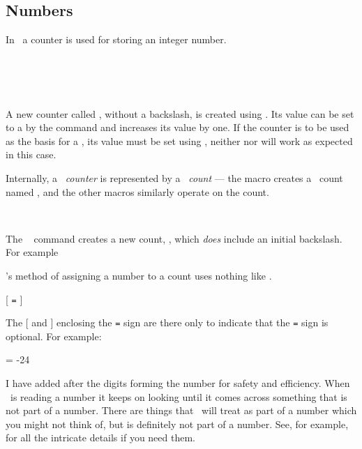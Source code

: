 \subsection{Numbers}

    In \ltx\ a counter is used for storing an integer number.
\begin{syntax}
\cmd{\newcounter} \\
\cmd{\setcounter} \\
\cmd{\stepcounter}  \\
\end{syntax}
A new counter called , without a backslash, is created using
\cmd{\newcounter}. Its value can be set to a  by the
\cmd{\setcounter} command and \cmd{\stepcounter} increases its value by one.
If the counter is to be used as the basis for a \cmd{\label}, its
value must be set using , neither \cmd{\stepcounter}
nor \cmd{\setcounter} will work as expected in this case.

    Internally, a \ltx\ \emph{counter} is represented by a \tx\ 
\emph{count} --- the \cmd{\newcounter} macro creates a
\tx\ count named , and the other 
macros similarly operate on the \cs{c@}\meta{counter} count.


\begin{syntax}
\cmd{\newcount} \\
\end{syntax}
The \tx\ \cmd{\newcount} command creates a new count, \meta{count}, which 
\emph{does} include an initial backslash. For example
\begin{lcode}
\newcount\mycount
\end{lcode}
\tx's method of assigning a number to a count uses nothing like 
\cmd{\setcounter}.
\begin{syntax}
 [ \texttt{=} ] \meta{number} \\
\end{syntax}
The [ and ] enclosing the \texttt{=} sign are there only
to indicate that the \texttt{=} sign is optional. For example:
\begin{lcode}
\mycount = -24\relax  %
\relax     %
\end{lcode}
I have added \cmd{\relax} after the digits forming the number for safety
and efficiency. When \tx\ is reading a number it keeps on looking until
it comes across something that is not part of a number. There are things 
that \tx\ will treat as part of a number which you might not think of, 
but \cmd{\relax} is definitely not part of a number. See, for example,
\cite[chapter 7]{TEXBYTOPIC} for all the intricate details if you need them.

